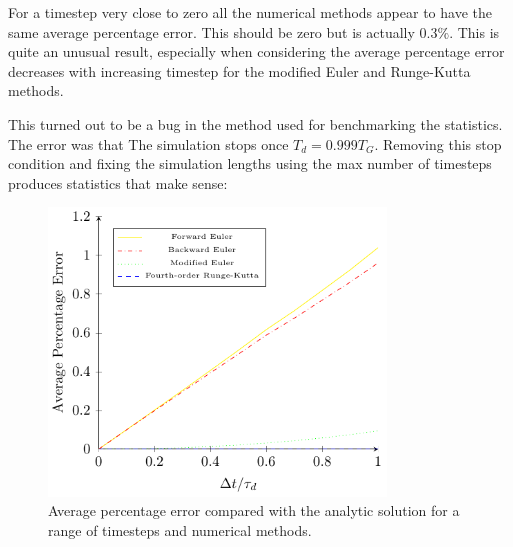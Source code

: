 \documentclass[../Interim_Report_Master]{subfiles}
\begin{document}
For a timestep very close to zero all the numerical methods appear to have the same average percentage error. This should be zero but is actually $0.3\%$. This is quite an unusual result, especially when considering the average percentage error decreases with increasing timestep for the modified Euler and Runge-Kutta methods. 

This turned out to be a bug in the method used for benchmarking the statistics. The error was that  The simulation stops once $T_d = 0.999T_G$. Removing this stop condition and fixing the simulation lengths using the max number of timesteps produces statistics that make sense:
\begin{figure}[H]
	\centering
	\includegraphics[width=0.8\textwidth]{./Diagrams/Uncoupled_Temp_Convergence_2/Uncoupled_Temp_Convergence_2.pdf}
	\caption{Average percentage error compared with the analytic solution for a range of timesteps and numerical methods.}
	\label{uc_temp_convergence_2}
\end{figure}
\end{document}
